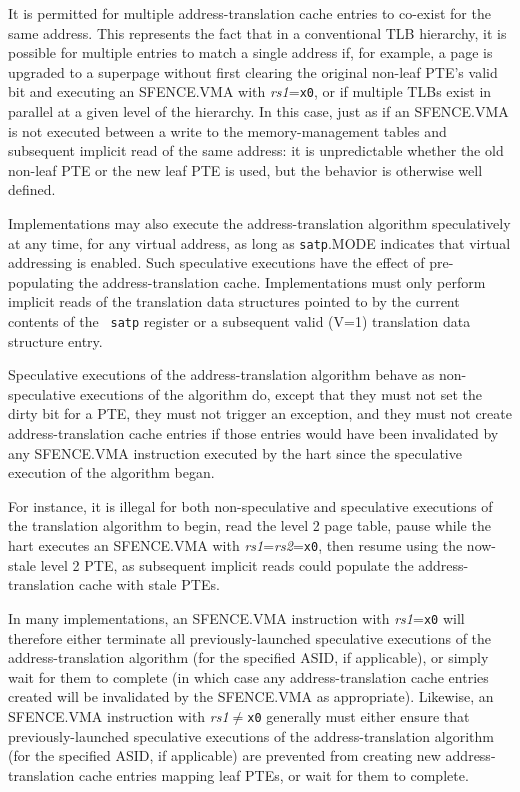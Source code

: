 \begin{commentary}
  It is permitted for multiple address-translation cache entries to co-exist
  for the same address.  This represents the fact that in a conventional TLB
  hierarchy, it is possible for multiple entries to match a single address if, for
  example, a page is upgraded to a superpage without first clearing the
  original non-leaf PTE's valid bit and executing an SFENCE.VMA with {\em
  rs1}={\tt x0}, or if multiple TLBs exist in parallel at a given level of the
  hierarchy.  In this case, just as if an SFENCE.VMA is not executed between
  a write to the memory-management tables and subsequent implicit read of the
  same address: it is unpredictable whether the old non-leaf PTE or the new leaf
  PTE is used, but the behavior is otherwise well defined.
\end{commentary}

Implementations may also execute the address-translation algorithm
speculatively at any time, for any virtual address, as long as {\tt satp}.MODE
indicates that virtual addressing is enabled.
Such speculative executions have the effect of pre-populating the
address-translation cache.  Implementations must only perform implicit reads of
the translation data structures pointed to by the current contents of the {\tt
satp} register or a subsequent valid (V=1) translation data structure entry.

Speculative executions of the address-translation algorithm behave as
non-speculative executions of the algorithm do, except that they must not set the
dirty bit for a PTE, they must not trigger an exception, and they must not create
address-translation cache entries if those entries would have been invalidated
by any SFENCE.VMA instruction executed by the hart since the speculative
execution of the algorithm began.

\begin{commentary}
  For instance, it is illegal for both non-speculative and speculative
  executions of the translation algorithm to begin, read the level 2 page table,
  pause while the hart executes an SFENCE.VMA with {\em rs1}={\em rs2}={\tt x0},
  then resume using the now-stale level 2 PTE, as subsequent implicit reads
  could populate the address-translation cache with stale PTEs.

  In many implementations, an SFENCE.VMA instruction with {\em rs1}={\tt x0}
  will therefore either terminate all previously-launched speculative
  executions of the address-translation algorithm (for the specified ASID, if
  applicable), or simply wait for them to complete (in which case any
  address-translation cache entries created will be invalidated by the
  SFENCE.VMA as appropriate).  Likewise, an SFENCE.VMA instruction with {\em
  rs1}$\neq${\tt x0} generally must either ensure that previously-launched
  speculative executions of the address-translation algorithm (for the specified
  ASID, if applicable) are prevented from creating new address-translation cache
  entries mapping leaf PTEs, or wait for them to complete.
\end{commentary}

